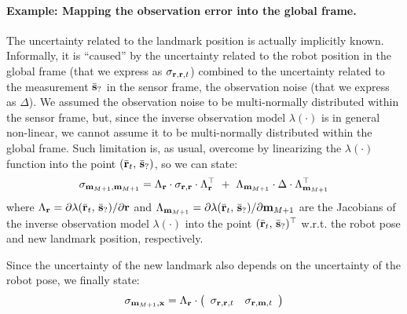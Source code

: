 	\paragraph{Example: Mapping the observation error into the global frame.}
		The uncertainty related to the landmark position is actually implicitly known.
		Informally, it is ``caused'' by the uncertainty related to the robot position in the global frame (that we express as $\sigma_{\boldsymbol{\mathrm{{r}}}, \boldsymbol{\mathrm{{r}}}, t}$) combined to the uncertainty related to the measurement $\bar{\boldsymbol{\mathrm{{s}}}}_?$ in the sensor frame, \ie{} the observation noise (that we express as $\Delta$).
		We assumed the observation noise to be multi-normally distributed within the sensor frame, but, since the inverse observation model $\lambda(\cdot)$ is in general non-linear, we cannot assume it to be multi-normally distributed within the global frame.
		Such limitation is, as usual, overcome by linearizing the $\lambda(\cdot)$ function into the point $(\bar{\boldsymbol{\mathrm{{r}}}}_t,\, \bar{\boldsymbol{\mathrm{{s}}}}_?)$, so we can state:
		\[
			\sigma_{\boldsymbol{\mathrm{{m}}}_{M+1},\boldsymbol{\mathrm{{m}}}_{M+1}} = \Lambda_{\boldsymbol{\mathrm{{r}}}} \cdot \sigma_{\boldsymbol{\mathrm{{r}}},\boldsymbol{\mathrm{{r}}}} \cdot \Lambda^\top_{\boldsymbol{\mathrm{{r}}}} \ + \ \Lambda_{\boldsymbol{\mathrm{{m}}}_{M+1}} \cdot \Delta \cdot \Lambda^\top_{\boldsymbol{\mathrm{{m}}}_{M+1}}
		\]
		where $\Lambda_{\boldsymbol{\mathrm{{r}}}} = \partial \lambda(\bar{\boldsymbol{\mathrm{{r}}}}_{t},\, \bar{\boldsymbol{\mathrm{{s}}}}_?) / \partial \boldsymbol{\mathrm{{r}}}$ and $\Lambda_{\boldsymbol{\mathrm{{m}}}_{M+1}} = \partial \lambda(\bar{\boldsymbol{\mathrm{{r}}}}_{t},\, \bar{\boldsymbol{\mathrm{{s}}}}_?) / \partial \boldsymbol{\mathrm{{m}}}_{M+1}$ are the Jacobians of the inverse observation model $\lambda(\cdot)$ into the point $(\bar{\boldsymbol{\mathrm{{r}}}}_{t},\, \bar{\boldsymbol{\mathrm{{s}}}}_?)^\top$ w.r.t. the robot pose and new landmark position, respectively.
		
		Since the uncertainty of the new landmark also depends on the uncertainty of the robot pose, we finally state:
		\[
			\sigma_{\boldsymbol{\mathrm{{m}}}_{M+1},\boldsymbol{\mathrm{{x}}}} = \Lambda_{\boldsymbol{\mathrm{{r}}}} \cdot 
			\left(\begin{array}{cc}
				\sigma_{\boldsymbol{\mathrm{{r}}}, \boldsymbol{\mathrm{{r}}}, t} & \sigma_{\boldsymbol{\mathrm{{r}}}, \boldsymbol{\mathrm{{m}}}, t}
			\end{array}\right)
		\]